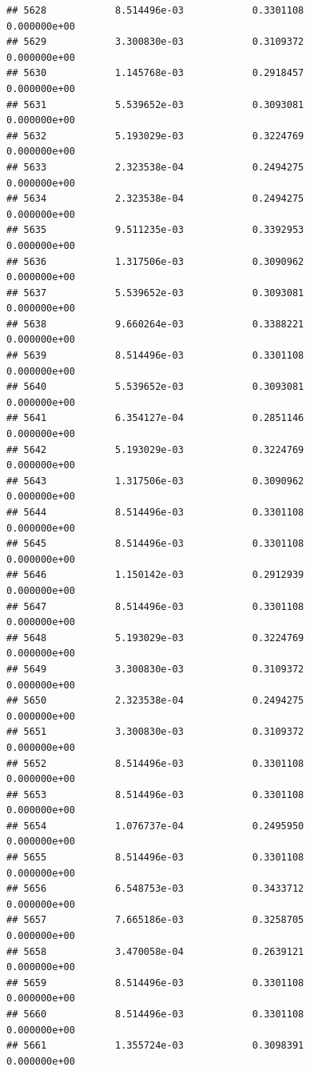 \documentclass[
]{article}
\begin{document}
\begin{verbatim}
## 5628            8.514496e-03            0.3301108            0.000000e+00
## 5629            3.300830e-03            0.3109372            0.000000e+00
## 5630            1.145768e-03            0.2918457            0.000000e+00
## 5631            5.539652e-03            0.3093081            0.000000e+00
## 5632            5.193029e-03            0.3224769            0.000000e+00
## 5633            2.323538e-04            0.2494275            0.000000e+00
## 5634            2.323538e-04            0.2494275            0.000000e+00
## 5635            9.511235e-03            0.3392953            0.000000e+00
## 5636            1.317506e-03            0.3090962            0.000000e+00
## 5637            5.539652e-03            0.3093081            0.000000e+00
## 5638            9.660264e-03            0.3388221            0.000000e+00
## 5639            8.514496e-03            0.3301108            0.000000e+00
## 5640            5.539652e-03            0.3093081            0.000000e+00
## 5641            6.354127e-04            0.2851146            0.000000e+00
## 5642            5.193029e-03            0.3224769            0.000000e+00
## 5643            1.317506e-03            0.3090962            0.000000e+00
## 5644            8.514496e-03            0.3301108            0.000000e+00
## 5645            8.514496e-03            0.3301108            0.000000e+00
## 5646            1.150142e-03            0.2912939            0.000000e+00
## 5647            8.514496e-03            0.3301108            0.000000e+00
## 5648            5.193029e-03            0.3224769            0.000000e+00
## 5649            3.300830e-03            0.3109372            0.000000e+00
## 5650            2.323538e-04            0.2494275            0.000000e+00
## 5651            3.300830e-03            0.3109372            0.000000e+00
## 5652            8.514496e-03            0.3301108            0.000000e+00
## 5653            8.514496e-03            0.3301108            0.000000e+00
## 5654            1.076737e-04            0.2495950            0.000000e+00
## 5655            8.514496e-03            0.3301108            0.000000e+00
## 5656            6.548753e-03            0.3433712            0.000000e+00
## 5657            7.665186e-03            0.3258705            0.000000e+00
## 5658            3.470058e-04            0.2639121            0.000000e+00
## 5659            8.514496e-03            0.3301108            0.000000e+00
## 5660            8.514496e-03            0.3301108            0.000000e+00
## 5661            1.355724e-03            0.3098391            0.000000e+00

\end{verbatim}
\end{document}
